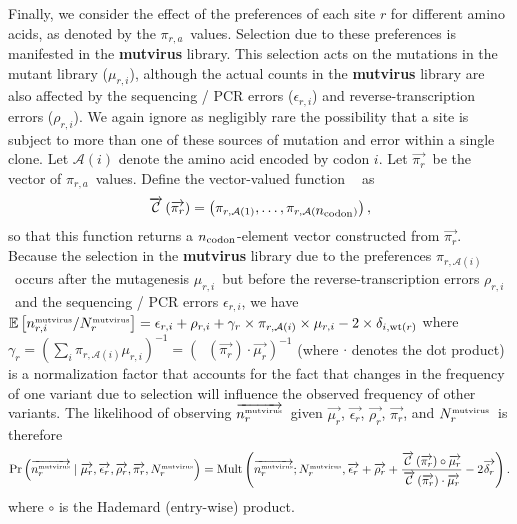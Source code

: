 \documentclass[12pt,draft]{article}
\DeclareMathOperator{\multinomial}{Mult}
\DeclareMathOperator{\wt}{wt}
\DeclareMathOperator{\picodonvec}{\overrightarrow{\mathcal{C}}}
\newcommand{\ncodon}{\mbox{$n_{\rm{codon}}$}}
\newcommand{\Nrmutvirus}{\mbox{$N_r^{\rm \scriptscriptstyle mut virus}$}}
\newcommand{\nrmutvirusi}{\mbox{$n_{r, i}^{\rm \scriptscriptstyle mut virus}$}}
\newcommand{\nrmutvirusvec}{\mbox{$\overrightarrow{n_{r}^{\rm \scriptscriptstyle mut virus}}$}}
\newcommand{\eri}{\mbox{$\epsilon_{r,i}$}}
\newcommand{\ervec}{\mbox{$\overrightarrow{\epsilon_{r}}$}}
\newcommand{\rri}{\mbox{$\rho_{r,i}$}}
\newcommand{\rrvec}{\mbox{$\overrightarrow{\rho_{r}}$}}
\newcommand{\mri}{\mbox{$\mu_{r,i}$}}
\newcommand{\mrvec}{\mbox{$\overrightarrow{\mu_{r}}$}}
\newcommand{\gammar}{\mbox{$\gamma_r$}}
\newcommand{\deltarvec}{\mbox{$\overrightarrow{\delta_r}$}}
\newcommand{\pira}{\mbox{$\pi_{r,a}$}}
\newcommand{\piri}{\mbox{$\pi_{r,\mathcal{A}\left(i\right)}$}}
\newcommand{\pirvec}{\mbox{$\overrightarrow{\pi_r}$}}
\newcommand{\E}{\mbox{$\mathbb{E}$}}
\begin{document}
Finally, we consider the effect of the preferences of each site $r$ for different amino acids, as denoted by the \pira\ values. Selection due to these preferences is manifested in the {\bf mutvirus} library. This selection acts on the mutations in the mutant library (\mri), although the actual counts in the {\bf mutvirus} library are also affected by the sequencing / PCR errors (\eri) and reverse-transcription errors (\rri). We again ignore as negligibly rare the possibility that a site is subject to more than one of these sources of mutation and error within a single clone. Let $\mathcal{A}\left(i\right)$ denote the amino acid encoded by codon $i$.  Let \pirvec\ be the vector of \pira\ values. Define the vector-valued function $\picodonvec$ as 
\begin{equation}
\label{eq:picodonvec}
\picodonvec\left(\pirvec\right) = \left(\pi_{r,\mathcal{A}\left(1\right)}, \ldots, \pi_{r,\mathcal{A}\left(\ncodon\right)}\right),
\end{equation}
so that this function returns a \ncodon-element vector constructed from \pirvec. Because the selection in the {\bf mutvirus} library due to the preferences \piri\ occurs after the mutagenesis \mri\ but before the reverse-transcription errors \rri\ and the sequencing / PCR errors \eri, we have $\E\left[\nrmutvirusi / \Nrmutvirus\right] = \eri + \rri + \gammar \times \piri \times \mri - 2 \times \delta_{i,\wt\left(r\right)}$ where $\gammar = \left(\sum\limits_i \piri \mri \right)^{-1} = \left(\picodonvec\left(\pirvec\right) \cdot \mrvec\right)^{-1}$ (where $\cdot$ denotes the dot product) is a normalization factor that  accounts for the fact that changes in the frequency of one variant due to selection will influence the observed frequency of other variants. The likelihood of observing \nrmutvirusvec\ given \mrvec, \ervec, \rrvec, \pirvec, and \Nrmutvirus\ is therefore
\begin{equation}
\label{eq:nrmutvirusveclikelihood}
\Pr\left(\nrmutvirusvec \mid \mrvec, \ervec, \rrvec, \pirvec, \Nrmutvirus \right) = \multinomial\left(\nrmutvirusvec; \Nrmutvirus, \ervec + \rrvec + \frac{\picodonvec\left(\pirvec\right) \circ \mrvec}{\picodonvec\left(\pirvec\right) \cdot \mrvec} - 2 \deltarvec \right).
\end{equation}
where $\circ$ is the Hademard (entry-wise) product.
\end{document}
